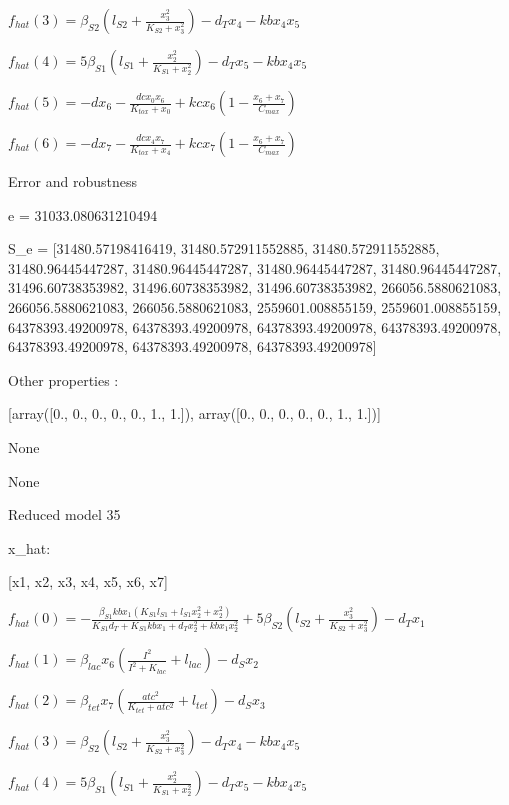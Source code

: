 $f_{hat}(3)=\beta_{S2} \left(l_{S2} + \frac{x_{3}^{2}}{K_{S2} + x_{3}^{2}}\right) - d_{T} x_{4} - kb x_{4} x_{5}$


$f_{hat}(4)=5 \beta_{S1} \left(l_{S1} + \frac{x_{2}^{2}}{K_{S1} + x_{2}^{2}}\right) - d_{T} x_{5} - kb x_{4} x_{5}$


$f_{hat}(5)=- d x_{6} - \frac{dc x_{0} x_{6}}{K_{tox} + x_{0}} + kc x_{6} \left(1 - \frac{x_{6} + x_{7}}{C_{max}}\right)$


$f_{hat}(6)=- d x_{7} - \frac{dc x_{4} x_{7}}{K_{tox} + x_{4}} + kc x_{7} \left(1 - \frac{x_{6} + x_{7}}{C_{max}}\right)$



Error and robustness 


e = 31033.080631210494

S_e = [31480.57198416419, 31480.572911552885, 31480.572911552885, 31480.96445447287, 31480.96445447287, 31480.96445447287, 31480.96445447287, 31496.60738353982, 31496.60738353982, 31496.60738353982, 266056.5880621083, 266056.5880621083, 266056.5880621083, 2559601.008855159, 2559601.008855159, 64378393.49200978, 64378393.49200978, 64378393.49200978, 64378393.49200978, 64378393.49200978, 64378393.49200978, 64378393.49200978]

Other properties :


[array([0., 0., 0., 0., 0., 1., 1.]), array([0., 0., 0., 0., 0., 1., 1.])]

None

None

Reduced model 35

x_{hat}: 

[x1, x2, x3, x4, x5, x6, x7]


$f_{hat}(0)=- \frac{\beta_{S1} kb x_{1} \left(K_{S1} l_{S1} + l_{S1} x_{2}^{2} + x_{2}^{2}\right)}{K_{S1} d_{T} + K_{S1} kb x_{1} + d_{T} x_{2}^{2} + kb x_{1} x_{2}^{2}} + 5 \beta_{S2} \left(l_{S2} + \frac{x_{3}^{2}}{K_{S2} + x_{3}^{2}}\right) - d_{T} x_{1}$


$f_{hat}(1)=\beta_{lac} x_{6} \left(\frac{I^{2}}{I^{2} + K_{lac}} + l_{lac}\right) - d_{S} x_{2}$


$f_{hat}(2)=\beta_{tet} x_{7} \left(\frac{atc^{2}}{K_{tet} + atc^{2}} + l_{tet}\right) - d_{S} x_{3}$


$f_{hat}(3)=\beta_{S2} \left(l_{S2} + \frac{x_{3}^{2}}{K_{S2} + x_{3}^{2}}\right) - d_{T} x_{4} - kb x_{4} x_{5}$


$f_{hat}(4)=5 \beta_{S1} \left(l_{S1} + \frac{x_{2}^{2}}{K_{S1} + x_{2}^{2}}\right) - d_{T} x_{5} - kb x_{4} x_{5}$


